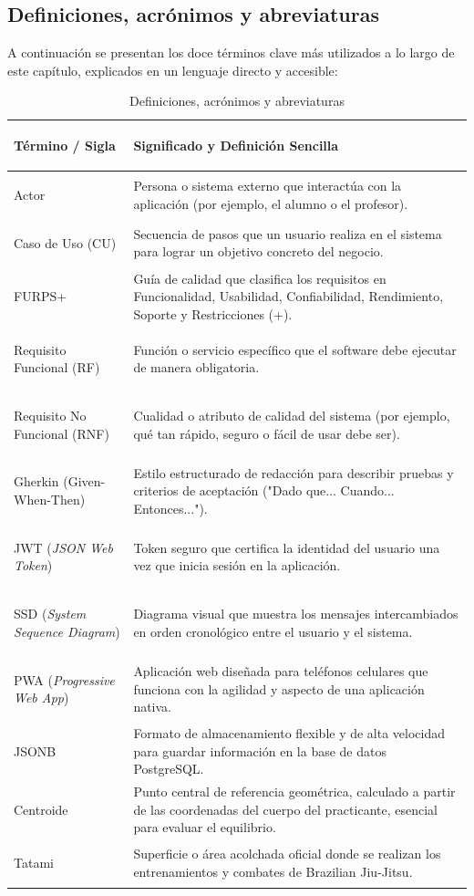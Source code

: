 \documentclass[12pt,letterpaper]{article}
\begin{document}
\subsection{Definiciones, acrónimos y abreviaturas}
A continuación se presentan los doce términos clave más utilizados a lo largo de este capítulo, explicados en un lenguaje directo y accesible:

\begin{table}[htbp]
\centering
\small
\begin{tabularx}{\textwidth}{|>{\bfseries\raggedright\arraybackslash}p{}|>{\raggedright\arraybackslash}X|}
    \hline
    Término / Sigla & Significado y Definición Sencilla \\ \hline
    Actor & Persona o sistema externo que interactúa con la aplicación (por ejemplo, el alumno o el profesor). \\ \hline
    Caso de Uso (CU) & Secuencia de pasos que un usuario realiza en el sistema para lograr un objetivo concreto del negocio. \\ \hline
    FURPS+ & Guía de calidad que clasifica los requisitos en Funcionalidad, Usabilidad, Confiabilidad, Rendimiento, Soporte y Restricciones (+). \\ \hline
    Requisito Funcional (RF) & Función o servicio específico que el software debe ejecutar de manera obligatoria. \\ \hline
    Requisito No Funcional (RNF) & Cualidad o atributo de calidad del sistema (por ejemplo, qué tan rápido, seguro o fácil de usar debe ser). \\ \hline
    Gherkin (Given-When-Then) & Estilo estructurado de redacción para describir pruebas y criterios de aceptación ("Dado que... Cuando... Entonces..."). \\ \hline
    JWT (\textit{JSON Web Token}) & Token seguro que certifica la identidad del usuario una vez que inicia sesión en la aplicación. \\ \hline
    SSD (\textit{System Sequence Diagram}) & Diagrama visual que muestra los mensajes intercambiados en orden cronológico entre el usuario y el sistema. \\ \hline
    PWA (\textit{Progressive Web App}) & Aplicación web diseñada para teléfonos celulares que funciona con la agilidad y aspecto de una aplicación nativa. \\ \hline
    JSONB & Formato de almacenamiento flexible y de alta velocidad para guardar información en la base de datos PostgreSQL. \\ \hline
    Centroide & Punto central de referencia geométrica, calculado a partir de las coordenadas del cuerpo del practicante, esencial para evaluar el equilibrio. \\ \hline
    Tatami & Superficie o área acolchada oficial donde se realizan los entrenamientos y combates de Brazilian Jiu-Jitsu. \\ \hline
\end{tabularx}
\caption{Definiciones, acrónimos y abreviaturas}
\label{tab:definiciones}
\end{table}
\end{document}
